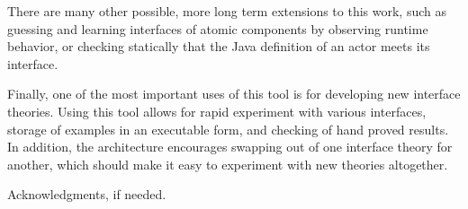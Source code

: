 \documentclass[preprint,11pt,authoryear]{sigplanconf}
\begin{document}
There are many other possible, more long term extensions to this work, such as guessing and learning interfaces of atomic components by observing runtime behavior, or checking statically that the Java definition of an actor meets its interface.

Finally, one of the most important uses of this tool is for developing new interface theories.
Using this tool allows for rapid experiment with various interfaces, storage of examples in an executable form, and checking of hand proved results.
In addition, the architecture encourages swapping out of one interface theory for another, which should make it easy to experiment with new theories altogether.


\acks

Acknowledgments, if needed.




\end{document}
